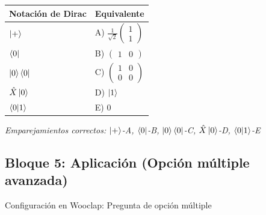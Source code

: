 \documentclass{unirTema}
\begin{document}
\begin{center}
  \begin{tabular}{ll}
    \hline
    \textbf{Notación de Dirac} & \textbf{Equivalente}                                        \\
    \hline
    $\ket{+}$                  & A) $\frac{1}{\sqrt{2}}\begin{pmatrix} 1 \\ 1 \end{pmatrix}$ \\[0.3cm]
    $\bra{0}$                  & B) $\begin{pmatrix} 1 & 0 \end{pmatrix}$                    \\[0.3cm]
    $\ket{0}\bra{0}$           & C) $\begin{pmatrix} 1 & 0 \\ 0 & 0 \end{pmatrix}$           \\[0.3cm]
    $\hat{X}\ket{0}$           & D) $\ket{1}$                                                \\[0.3cm]
    $\braket{0}{1}$            & E) $0$                                                      \\
    \hline
  \end{tabular}
\end{center}

\textit{Emparejamientos correctos: $\ket{+}$-A, $\bra{0}$-B, $\ket{0}\bra{0}$-C, $\hat{X}\ket{0}$-D, $\braket{0}{1}$-E}

\subsection*{Bloque 5: Aplicación (Opción múltiple avanzada)}

Configuración en Wooclap: Pregunta de opción múltiple
\end{document}
